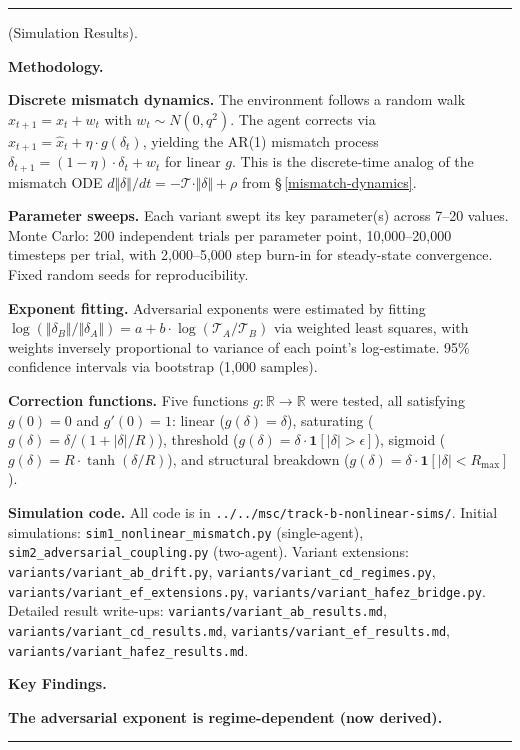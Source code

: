 \documentclass[11pt,oneside]{article}
\newcounter{claim}[section]
\renewcommand{\theclaim}{\thesection.\arabic{claim}}
\newenvironment{segment}[2]{%
  \refstepcounter{claim}%
  \bigskip\noindent\hrule\smallskip
  \noindent{\bfseries #1~\theclaim}\enskip(#2).\par\smallskip
  \noindent\ignorespaces
}{%
  \par\smallskip\noindent\hrule\bigskip
}
\newenvironment{detail}[1][]{\begin{segment}{Detail}{#1}}{\end{segment}}
\begin{document}
\begin{detail}[Simulation Results]
\medskip\noindent\textbf{Methodology.}


\textbf{Discrete mismatch dynamics.} The environment follows a random walk $x_{t+1} = x_t + w_t$ with $w_t \sim N(0, q^2)$. The agent corrects via $\hat x_{t+1} = \hat x_t + \eta \cdot g(\delta_t)$, yielding the AR(1) mismatch process $\delta_{t+1} = (1 - \eta) \cdot \delta_t + w_t$ for linear $g$. This is the discrete-time analog of the mismatch ODE $d\Vert\delta\Vert/dt = -\mathcal{T} \cdot \Vert\delta\Vert + \rho$ from \S\,\ref{mismatch-dynamics}.

\textbf{Parameter sweeps.} Each variant swept its key parameter(s) across 7--20 values. Monte Carlo: 200 independent trials per parameter point, 10,000--20,000 timesteps per trial, with 2,000--5,000 step burn-in for steady-state convergence. Fixed random seeds for reproducibility.

\textbf{Exponent fitting.} Adversarial exponents were estimated by fitting $\log(\Vert\delta_B\Vert / \Vert\delta_A\Vert) = a + b \cdot \log(\mathcal T_A / \mathcal T_B)$ via weighted least squares, with weights inversely proportional to variance of each point's log-estimate. 95\% confidence intervals via bootstrap (1,000 samples).

\textbf{Correction functions.} Five functions $g: \mathbb{R} \to \mathbb{R}$ were tested, all satisfying $g(0) = 0$ and $g'(0) = 1$: linear ($g(\delta) = \delta$), saturating ($g(\delta) = \delta / (1 + \lvert\delta\rvert/R)$), threshold ($g(\delta) = \delta \cdot \mathbf{1}[\lvert\delta\rvert > \epsilon]$), sigmoid ($g(\delta) = R \cdot \tanh(\delta/R)$), and structural breakdown ($g(\delta) = \delta \cdot \mathbf{1}[\lvert\delta\rvert < R_\text{max}]$).

\textbf{Simulation code.} All code is in \texttt{../../msc/track-b-nonlinear-sims/}. Initial simulations: \texttt{sim1\_nonlinear\_mismatch.py} (single-agent), \texttt{sim2\_adversarial\_coupling.py} (two-agent). Variant extensions: \texttt{variants/variant\_ab\_drift.py}, \texttt{variants/variant\_cd\_regimes.py}, \texttt{variants/variant\_ef\_extensions.py}, \texttt{variants/variant\_hafez\_bridge.py}. Detailed result write-ups: \texttt{variants/variant\_ab\_results.md}, \texttt{variants/variant\_cd\_results.md}, \texttt{variants/variant\_ef\_results.md}, \texttt{variants/variant\_hafez\_results.md}.


\medskip\noindent\textbf{Key Findings.}



\medskip\noindent\textbf{The adversarial exponent is regime-dependent (now derived).}



\end{detail}
\end{document}

